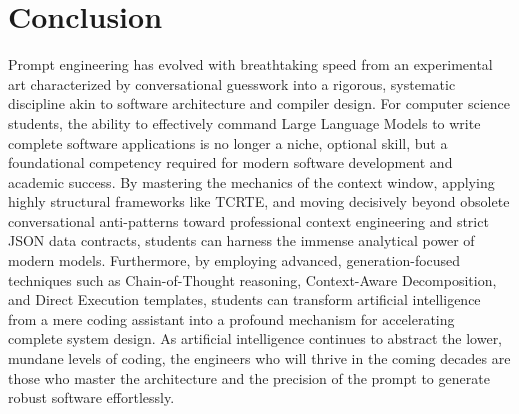 \documentclass[12pt]{article}
\begin{document}
\section{Conclusion}Prompt engineering has evolved with breathtaking speed from an experimental art
characterized by conversational guesswork into a rigorous, systematic discipline akin to software architecture
and compiler design. For computer science students, the ability to effectively command Large Language Models to
write complete software applications is no longer a niche, optional skill, but a foundational competency
required for modern software development and academic success. By mastering the mechanics of the context window,
applying highly structural frameworks like TCRTE, and moving decisively beyond obsolete conversational
anti-patterns toward professional context engineering and strict JSON data contracts, students can harness the
immense analytical power of modern models. Furthermore, by employing advanced, generation-focused techniques
such as Chain-of-Thought reasoning, Context-Aware Decomposition, and Direct Execution templates, students can
transform artificial intelligence from a mere coding assistant into a profound mechanism for accelerating
complete system design. As artificial intelligence continues to abstract the lower, mundane levels of coding,
the engineers who will thrive in the coming decades are those who master the architecture and the precision of
the prompt to generate robust software effortlessly. 
\end{document}
